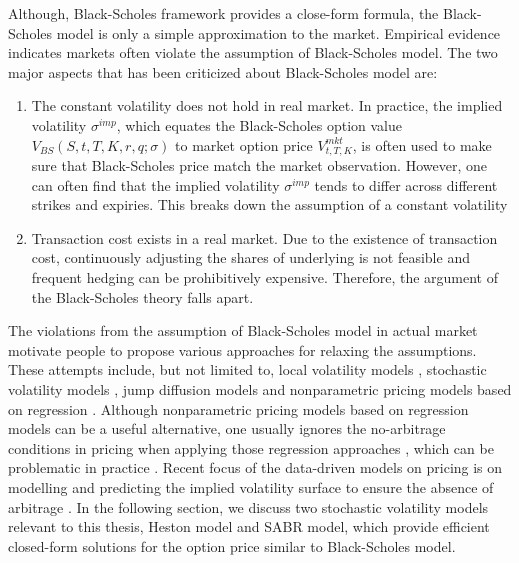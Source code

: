 \documentclass[letterpaper,12pt,titlepage,oneside,final]{book}
\numberwithin{equation}{section}
\theoremstyle{definition}
\begin{document}
Although, Black-Scholes framework provides a  close-form formula, the Black-Scholes model is only a simple approximation to the market. Empirical  evidence indicates markets often violate the assumption of   Black-Scholes model. The two major aspects that has been criticized about Black-Scholes model are:
\begin{enumerate}
\item The constant volatility does not hold in real market. In practice, the implied volatility $\sigma^{imp}$, which equates the Black-Scholes option value $V_{BS}(S,t,T,K,r,q;\sigma)$ to market option price $V^{mkt}_{t,T,K}$, is often used to make sure that Black-Scholes price match the market observation. However, one can often find that the implied volatility $\sigma^{imp}$ tends to differ across different strikes and expiries. This breaks down the assumption of a constant volatility
\item Transaction cost exists in a real market. Due to the existence of transaction cost, continuously adjusting the shares of underlying is not feasible and frequent hedging can be prohibitively expensive. Therefore, the argument of the Black-Scholes theory falls apart.
\end{enumerate}
The violations from the assumption of Black-Scholes model in actual market  motivate people to propose various approaches for relaxing the assumptions. These attempts include, but not limited to, local volatility models \citep{coleman2001,dumas1998implied,rubinstein1994implied,dupire1994pricing}, stochastic volatility models \cite{hagan2002managing,heston1993closed,hull1987pricing,bakshi1997empirical}, jump diffusion models \citep{He06,kou2002jump} and nonparametric pricing models based on regression \citep{yao2000option,bennell2004black,gradojevic2009option,garcia2000pricing,malliaris1993neural}. Although nonparametric pricing models based on regression models can be a useful alternative, one usually ignores the no-arbitrage conditions in pricing when applying those regression approaches \citep{yao2000option,bennell2004black,gradojevic2009option,garcia2000pricing,malliaris1993neural}, which can be problematic in practice \cite{itkin2019deep}. Recent focus of the data-driven models on pricing is on modelling and predicting the implied volatility surface to ensure the absence of arbitrage \cite{cao2021option,zheng2021incorporating,liu2019pricing}.
In the following section, we discuss two stochastic volatility models relevant to this thesis, Heston model and SABR model, which provide efficient closed-form solutions for the option price similar to Black-Scholes model.
\end{document}
